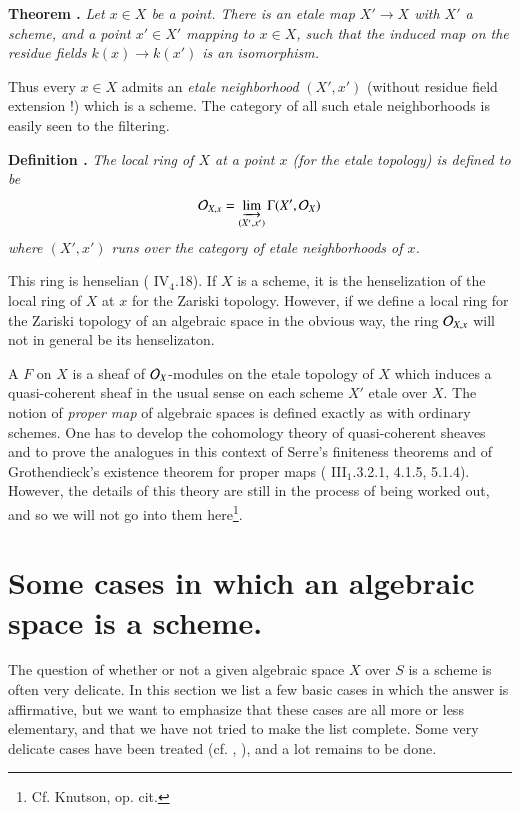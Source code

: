 \medskip
\noindent
{\bf Theorem .\label{art02-thm2.4}}
{\em Let $x\in X$ be a point. There is an etale map $X'\to X$ with $X'$ a scheme, and a point $x'\in X'$ mapping to $x\in X$, such that the induced map on the residue fields $k(x)\to k(x')$ is an isomorphism.}
\smallskip

Thus every $x\in X$ admits an {\em etale neighborhood} $(X',x')$ (without residue field extension !) which is a scheme. The category of all such etale neighborhoods is easily seen to the filtering.

\medskip
\noindent
{\bf Definition .\label{art02-defi2.5}}
{\em The local ring of $X$ at a point $x$ (for the etale topology) is defined to be}
$$
\mathcal{O}_{X,x}=\varinjlim\limits_{(X',x')}\Gamma (X',\mathcal{O}_{X})
$$
{\em where $(X',x')$ runs over the category of etale neighborhoods of $x$.}
\smallskip

This ring is henselian (\cite{art02-key8} IV$_{4}$.18). If $X$ is a scheme, it is the henseli\-zation of the local ring of $X$ at $x$ for the Zariski topology. However, if we define a local ring for the Zariski topology of an algebraic space in the obvious way, the ring $\mathcal{O}_{X,x}$ will not in general be its henselizaton.

A $F$ on $X$ is a sheaf of $\mathcal{O}_{X}$-modules on the etale topology of $X$ which induces a quasi-coherent sheaf in the usual sense on each scheme $X'$ etale over $X$. The notion of {\em proper map} of algebraic spaces is defined exactly as with ordinary schemes. One has to develop the cohomology theory of quasi-coherent sheaves and to prove the analogues in this context of Serre's finiteness theorems and of Grothendieck's existence theorem for proper maps (\cite{art02-key8} III$_{1}$.3.2.1, 4.1.5, 5.1.4). However, the details of this theory are still in the process of being worked out, and so we will not go into them here\footnote{Cf. Knutson, op. cit.}.

\section{Some cases in which an algebraic space is a scheme.}\label{art02-sec3}

The question of whether or not a given algebraic space $X$ over $S$ is a scheme is often very delicate. In this section we list a few basic cases in which the answer is affirmative, but we want to emphasize that these cases are all more or less elementary, and that we have not tried to make the list complete. Some very delicate cases have been treated (cf. \cite{art02-key25}, \cite{art02-key30}), and a lot remains to be done.

